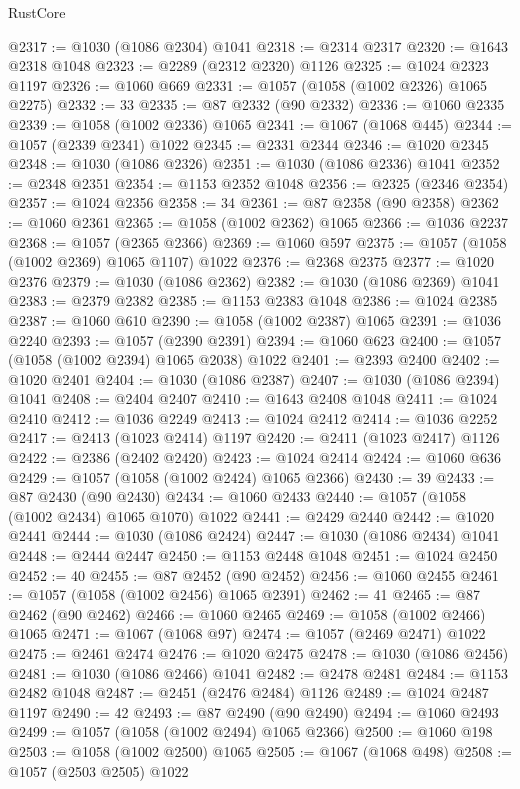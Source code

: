 \begin{lexlean}{RustCore}
\begin{coremodule}
@2317 := @1030 (@1086 @2304) @1041
@2318 := @2314 @2317
@2320 := @1643 @2318 @1048
@2323 := @2289 (@2312 @2320) @1126
@2325 := @1024 @2323 @1197
@2326 := @1060 @669
@2331 := @1057 (@1058 (@1002 @2326) @1065 @2275)
@2332 := 33
@2335 := @87 @2332 (@90 @2332)
@2336 := @1060 @2335
@2339 := @1058 (@1002 @2336) @1065
@2341 := @1067 (@1068 @445)
@2344 := @1057 (@2339 @2341) @1022
@2345 := @2331 @2344
@2346 := @1020 @2345
@2348 := @1030 (@1086 @2326)
@2351 := @1030 (@1086 @2336) @1041
@2352 := @2348 @2351
@2354 := @1153 @2352 @1048
@2356 := @2325 (@2346 @2354)
@2357 := @1024 @2356
@2358 := 34
@2361 := @87 @2358 (@90 @2358)
@2362 := @1060 @2361
@2365 := @1058 (@1002 @2362) @1065
@2366 := @1036 @2237
@2368 := @1057 (@2365 @2366)
@2369 := @1060 @597
@2375 := @1057 (@1058 (@1002 @2369) @1065 @1107) @1022
@2376 := @2368 @2375
@2377 := @1020 @2376
@2379 := @1030 (@1086 @2362)
@2382 := @1030 (@1086 @2369) @1041
@2383 := @2379 @2382
@2385 := @1153 @2383 @1048
@2386 := @1024 @2385
@2387 := @1060 @610
@2390 := @1058 (@1002 @2387) @1065
@2391 := @1036 @2240
@2393 := @1057 (@2390 @2391)
@2394 := @1060 @623
@2400 := @1057 (@1058 (@1002 @2394) @1065 @2038) @1022
@2401 := @2393 @2400
@2402 := @1020 @2401
@2404 := @1030 (@1086 @2387)
@2407 := @1030 (@1086 @2394) @1041
@2408 := @2404 @2407
@2410 := @1643 @2408 @1048
@2411 := @1024 @2410
@2412 := @1036 @2249
@2413 := @1024 @2412
@2414 := @1036 @2252
@2417 := @2413 (@1023 @2414) @1197
@2420 := @2411 (@1023 @2417) @1126
@2422 := @2386 (@2402 @2420)
@2423 := @1024 @2414
@2424 := @1060 @636
@2429 := @1057 (@1058 (@1002 @2424) @1065 @2366)
@2430 := 39
@2433 := @87 @2430 (@90 @2430)
@2434 := @1060 @2433
@2440 := @1057 (@1058 (@1002 @2434) @1065 @1070) @1022
@2441 := @2429 @2440
@2442 := @1020 @2441
@2444 := @1030 (@1086 @2424)
@2447 := @1030 (@1086 @2434) @1041
@2448 := @2444 @2447
@2450 := @1153 @2448 @1048
@2451 := @1024 @2450
@2452 := 40
@2455 := @87 @2452 (@90 @2452)
@2456 := @1060 @2455
@2461 := @1057 (@1058 (@1002 @2456) @1065 @2391)
@2462 := 41
@2465 := @87 @2462 (@90 @2462)
@2466 := @1060 @2465
@2469 := @1058 (@1002 @2466) @1065
@2471 := @1067 (@1068 @97)
@2474 := @1057 (@2469 @2471) @1022
@2475 := @2461 @2474
@2476 := @1020 @2475
@2478 := @1030 (@1086 @2456)
@2481 := @1030 (@1086 @2466) @1041
@2482 := @2478 @2481
@2484 := @1153 @2482 @1048
@2487 := @2451 (@2476 @2484) @1126
@2489 := @1024 @2487 @1197
@2490 := 42
@2493 := @87 @2490 (@90 @2490)
@2494 := @1060 @2493
@2499 := @1057 (@1058 (@1002 @2494) @1065 @2366)
@2500 := @1060 @198
@2503 := @1058 (@1002 @2500) @1065
@2505 := @1067 (@1068 @498)
@2508 := @1057 (@2503 @2505) @1022

\end{coremodule}
\end{lexlean}
